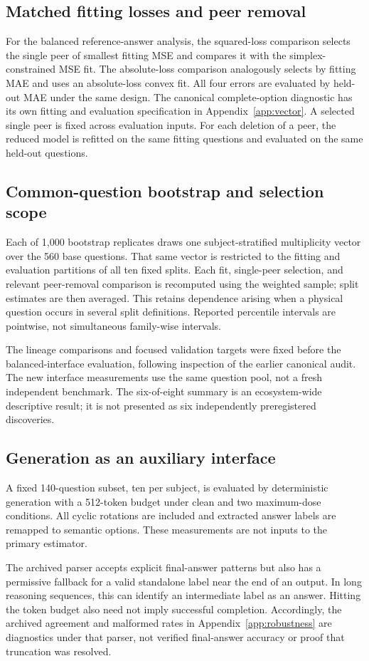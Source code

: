 \subsection{Matched fitting losses and peer removal}
For the balanced reference-answer analysis, the squared-loss comparison selects the single peer of smallest fitting MSE and compares it with the simplex-constrained MSE fit. The absolute-loss comparison analogously selects by fitting MAE and uses an absolute-loss convex fit. All four errors are evaluated by held-out MAE under the same design. The canonical complete-option diagnostic has its own fitting and evaluation specification in Appendix~\ref{app:vector}. A selected single peer is fixed across evaluation inputs. For each deletion of a peer, the reduced model is refitted on the same fitting questions and evaluated on the same held-out questions.

\subsection{Common-question bootstrap and selection scope}
Each of 1,000 bootstrap replicates draws one subject-stratified multiplicity vector over the 560 base questions. That same vector is restricted to the fitting and evaluation partitions of all ten fixed splits. Each fit, single-peer selection, and relevant peer-removal comparison is recomputed using the weighted sample; split estimates are then averaged. This retains dependence arising when a physical question occurs in several split definitions. Reported percentile intervals are pointwise, not simultaneous family-wise intervals.

The lineage comparisons and focused validation targets were fixed before the balanced-interface evaluation, following inspection of the earlier canonical audit. The new interface measurements use the same question pool, not a fresh independent benchmark. The six-of-eight summary is an ecosystem-wide descriptive result; it is not presented as six independently preregistered discoveries.

\subsection{Generation as an auxiliary interface}
A fixed 140-question subset, ten per subject, is evaluated by deterministic generation with a 512-token budget under clean and two maximum-dose conditions. All cyclic rotations are included and extracted answer labels are remapped to semantic options. These measurements are not inputs to the primary \PIER estimator.

The archived parser accepts explicit final-answer patterns but also has a permissive fallback for a valid standalone label near the end of an output. In long reasoning sequences, this can identify an intermediate label as an answer. Hitting the token budget also need not imply successful completion. Accordingly, the archived agreement and malformed rates in Appendix~\ref{app:robustness} are diagnostics under that parser, not verified final-answer accuracy or proof that truncation was resolved.
